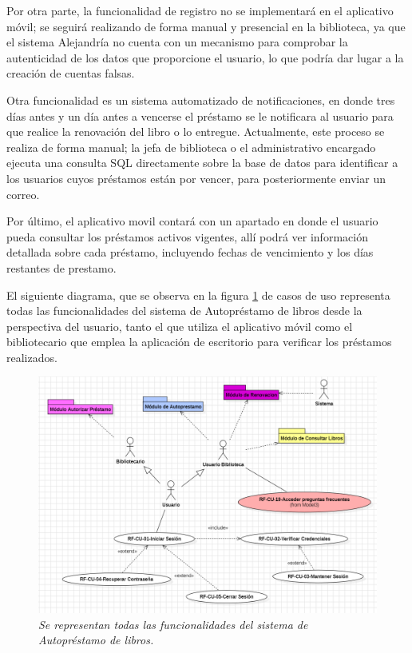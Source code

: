 \documentclass[spanish]{ieee_upb}
\begin{document}
Por otra parte, la funcionalidad de registro no se implementará en el aplicativo móvil; se seguirá realizando de forma manual y presencial en la biblioteca, ya que el sistema Alejandría no cuenta con un mecanismo para comprobar la autenticidad de los datos que proporcione el usuario, lo que podría dar lugar a la creación de cuentas falsas.
\vspace{0.3 cm}

 Otra funcionalidad es un sistema automatizado de notificaciones, en donde tres días antes y un día antes a vencerse el préstamo se le notificara al usuario para que realice la renovación del libro o lo entregue. Actualmente, este proceso se realiza de forma manual; la jefa de biblioteca o el administrativo encargado ejecuta una consulta SQL directamente sobre la base de datos para identificar a los usuarios cuyos préstamos están por vencer, para posteriormente enviar un correo. 
\vspace{0.3 cm}

 Por último, el aplicativo movil contará con un apartado en donde el usuario pueda consultar los préstamos activos vigentes, allí podrá ver información detallada sobre cada préstamo, incluyendo fechas de vencimiento y los días restantes de prestamo.
 \vspace{0.3 cm}

 El siguiente diagrama, que se observa en la figura \ref{fig:diagramaCasosdeUso} de casos de uso representa todas las funcionalidades del sistema de Autopréstamo de libros desde la perspectiva del usuario, tanto el que utiliza el aplicativo móvil como el bibliotecario que emplea la aplicación de escritorio para verificar los préstamos realizados. \vspace{0.3 cm}
  \begin{figure}[H] 
	\centering
	\includegraphics[width=0.7\linewidth]{img/diagramaCasosdeUso.png}
	\vspace{-1mm}
	\caption[Diagrama General de Casos de Uso]{\textit{Se representan todas las funcionalidades del sistema de Autopréstamo de libros.}}
	\label{fig:diagramaCasosdeUso} 
\end{figure}
\end{document}
